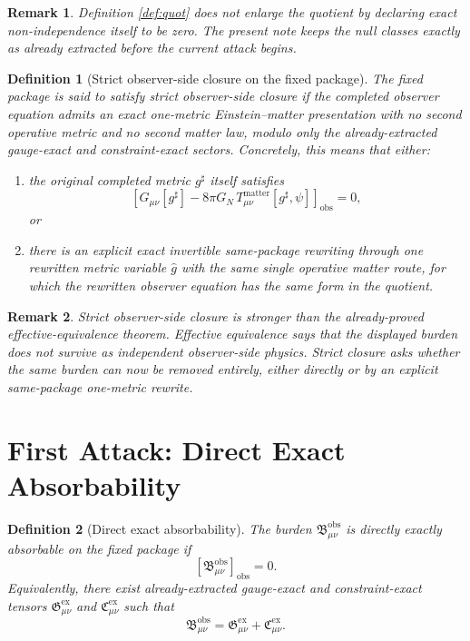 \documentclass[11pt]{article}
\newcommand{\CompletedMetric}{g^{\sharp}}
\newcommand{\RedefMetric}{\widehat g}
\newcommand{\ObsBurden}{\mathfrak B_{\mu\nu}^{\mathrm{obs}}}
\newcommand{\ObserverClass}[1]{\left[#1\right]_{\mathrm{obs}}}
\newcommand{\GaugeExact}{\mathfrak G_{\mu\nu}^{\mathrm{ex}}}
\newcommand{\ConstraintExact}{\mathfrak C_{\mu\nu}^{\mathrm{ex}}}
\newtheorem{definition}{Definition}
\newtheorem{remark}{Remark}
\begin{document}
\begin{remark}
Definition \ref{def:quot} does not enlarge the quotient by declaring exact non-independence itself to be zero. The present note keeps the null classes exactly as already extracted before the current attack begins.
\end{remark}

\begin{definition}[Strict observer-side closure on the fixed package]
\label{def:strict}
The fixed package is said to satisfy \emph{strict observer-side closure} if the completed observer equation admits an exact one-metric Einstein--matter presentation with no second operative metric and no second matter law, modulo only the already-extracted gauge-exact and constraint-exact sectors. Concretely, this means that either:
\begin{enumerate}
    \item the original completed metric \(\CompletedMetric\) itself satisfies
    \begin{equation}
    \ObserverClass{G_{\mu\nu}[\CompletedMetric]-8\pi G_N\,T_{\mu\nu}^{\mathrm{matter}}[\CompletedMetric,\psi]}=0,
    \label{eq:strictdirect}
    \end{equation}
    or
    \item there is an explicit exact invertible same-package rewriting through one rewritten metric variable \(\RedefMetric\) with the same single operative matter route, for which the rewritten observer equation has the same form in the quotient.
\end{enumerate}
\end{definition}

\begin{remark}
Strict observer-side closure is stronger than the already-proved effective-equivalence theorem. Effective equivalence says that the displayed burden does not survive as \emph{independent} observer-side physics. Strict closure asks whether the same burden can now be removed entirely, either directly or by an explicit same-package one-metric rewrite.
\end{remark}

\section{First Attack: Direct Exact Absorbability}

\begin{definition}[Direct exact absorbability]
\label{def:direct}
The burden \(\ObsBurden\) is \emph{directly exactly absorbable} on the fixed package if
\begin{equation}
\ObserverClass{\ObsBurden}=0.
\label{eq:obsvanish}
\end{equation}
Equivalently, there exist already-extracted gauge-exact and constraint-exact tensors \(\GaugeExact\) and \(\ConstraintExact\) such that
\begin{equation}
\ObsBurden=\GaugeExact+\ConstraintExact.
\label{eq:direct}
\end{equation}
\end{definition}
\end{document}
